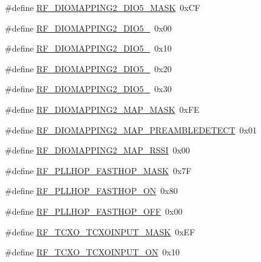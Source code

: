 \begin{DoxyCompactItemize}
\item 
\#define \mbox{\hyperlink{sx1276_regs-_fsk_8h_a7f2fac07e30561cbe8a856d35592704e}{R\+F\+\_\+\+D\+I\+O\+M\+A\+P\+P\+I\+N\+G2\+\_\+\+D\+I\+O5\+\_\+\+M\+A\+SK}}~0x\+CF
\item 
\#define \mbox{\hyperlink{sx1276_regs-_fsk_8h_a49d9e03aef7b56e4772c7af5f55822b2}{R\+F\+\_\+\+D\+I\+O\+M\+A\+P\+P\+I\+N\+G2\+\_\+\+D\+I\+O5\+\_}}~0x00
\item 
\#define \mbox{\hyperlink{sx1276_regs-_fsk_8h_a3fa8da47f99319005e509c21a50e48b0}{R\+F\+\_\+\+D\+I\+O\+M\+A\+P\+P\+I\+N\+G2\+\_\+\+D\+I\+O5\+\_}}~0x10
\item 
\#define \mbox{\hyperlink{sx1276_regs-_fsk_8h_a259874b1f6f9963873c96de8b0bb6c30}{R\+F\+\_\+\+D\+I\+O\+M\+A\+P\+P\+I\+N\+G2\+\_\+\+D\+I\+O5\+\_}}~0x20
\item 
\#define \mbox{\hyperlink{sx1276_regs-_fsk_8h_ace7d0c4a788c6e13dd2ba438eb4ea344}{R\+F\+\_\+\+D\+I\+O\+M\+A\+P\+P\+I\+N\+G2\+\_\+\+D\+I\+O5\+\_}}~0x30
\item 
\#define \mbox{\hyperlink{sx1276_regs-_fsk_8h_aa2e45e0e210e6bb7c122982f17433ad4}{R\+F\+\_\+\+D\+I\+O\+M\+A\+P\+P\+I\+N\+G2\+\_\+\+M\+A\+P\+\_\+\+M\+A\+SK}}~0x\+FE
\item 
\#define \mbox{\hyperlink{sx1276_regs-_fsk_8h_a6a4137adde392024770632b94ce5b78a}{R\+F\+\_\+\+D\+I\+O\+M\+A\+P\+P\+I\+N\+G2\+\_\+\+M\+A\+P\+\_\+\+P\+R\+E\+A\+M\+B\+L\+E\+D\+E\+T\+E\+CT}}~0x01
\item 
\#define \mbox{\hyperlink{sx1276_regs-_fsk_8h_a6e81c871f9411523c67383b1accfac64}{R\+F\+\_\+\+D\+I\+O\+M\+A\+P\+P\+I\+N\+G2\+\_\+\+M\+A\+P\+\_\+\+R\+S\+SI}}~0x00
\item 
\#define \mbox{\hyperlink{sx1276_regs-_fsk_8h_a840e28ff315779d1bb03dbdde40d099b}{R\+F\+\_\+\+P\+L\+L\+H\+O\+P\+\_\+\+F\+A\+S\+T\+H\+O\+P\+\_\+\+M\+A\+SK}}~0x7F
\item 
\#define \mbox{\hyperlink{sx1276_regs-_fsk_8h_aca81d0d430dc3da63986cfec9c71419f}{R\+F\+\_\+\+P\+L\+L\+H\+O\+P\+\_\+\+F\+A\+S\+T\+H\+O\+P\+\_\+\+ON}}~0x80
\item 
\#define \mbox{\hyperlink{sx1276_regs-_fsk_8h_a212139c0fe426dc287805ec078162052}{R\+F\+\_\+\+P\+L\+L\+H\+O\+P\+\_\+\+F\+A\+S\+T\+H\+O\+P\+\_\+\+O\+FF}}~0x00
\item 
\#define \mbox{\hyperlink{sx1276_regs-_fsk_8h_aa006a0facb06e3841fd1b526a2e33a63}{R\+F\+\_\+\+T\+C\+X\+O\+\_\+\+T\+C\+X\+O\+I\+N\+P\+U\+T\+\_\+\+M\+A\+SK}}~0x\+EF
\item 
\#define \mbox{\hyperlink{sx1276_regs-_fsk_8h_a617bfeb60948f03de66b96101a3db22f}{R\+F\+\_\+\+T\+C\+X\+O\+\_\+\+T\+C\+X\+O\+I\+N\+P\+U\+T\+\_\+\+ON}}~0x10

\end{DoxyCompactItemize}
